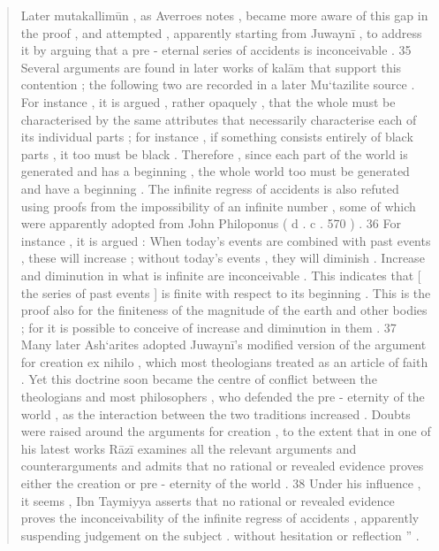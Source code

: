 \begin{quote}
Later mutakallimūn , as Averroes notes , became more aware of this gap in the proof , and attempted , apparently starting from Juwaynī , to address it by arguing that a pre - eternal series of accidents is inconceivable . 35 Several arguments are found in later works of kalām that support this contention ; the following two are recorded in a later Mu‘tazilite source . For instance , it is argued , rather opaquely , that the whole must be characterised by the same attributes that necessarily characterise each of its individual parts ; for instance , if something consists entirely of black parts , it too must be black . Therefore , since each part of the world is generated and has a beginning , the whole world too must be generated and have a beginning . The infinite regress of accidents is also refuted using proofs from the impossibility of an infinite number , some of which were apparently adopted from John Philoponus ( d . c . 570 ) . 36 For instance , it is argued : When today’s events are combined with past events , these will increase ; without today’s events , they will
diminish . Increase and diminution in what is infinite are inconceivable . This indicates that [ the series of past events ] is finite with respect to its beginning . This is the proof also for the finiteness of the magnitude of the earth and other bodies ; for it is possible to conceive of increase and diminution in them . 37 Many later Ash‘arites adopted Juwaynī’s modified version of the argument for creation ex nihilo , which most theologians treated as an article of faith . Yet this doctrine soon became the centre of conflict between the theologians and most philosophers , who defended the pre - eternity of the world , as the interaction between the two traditions increased . Doubts were raised around the arguments for creation , to the extent that in one of his latest works Rāzī examines all the relevant arguments and counterarguments and admits that no rational or revealed evidence proves either the creation or pre - eternity of the world . 38 Under his influence , it seems , Ibn Taymiyya asserts that no rational or revealed evidence proves the inconceivability of the infinite regress of accidents , apparently suspending judgement on the subject .
without hesitation or reflection ” .


\end{quote}
